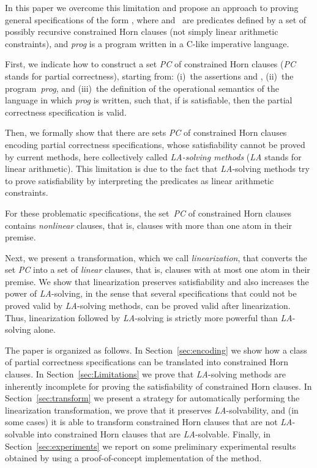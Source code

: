 \documentclass[english]{tlp}
\begin{document}
In this paper we overcome this limitation and propose an approach 
to proving general specifications of the form 
, where  
and~ are predicates defined by a set of possibly recursive constrained Horn clauses 
(not simply linear arithmetic constraints), 
and {\it prog} is a program written in a C-like imperative language.

First, we indicate how to construct 
a set \textit{PC}  of constrained Horn clauses (\textit{PC} stands for 
partial correctness), 
starting from: (i)~the assertions  and , 
(ii)~the program~\textit{prog}, and (iii)~the 
definition of the operational semantics of the language in which
 \textit{prog} is written, 
such that, if  is satisfiable, then the partial correctness 
specification  is valid.

Then, we formally show that there are sets \textit{PC} of constrained Horn clauses
encoding partial correctness specifications, whose satisfiability cannot  be
proved by current methods,
here collectively called {\it \mbox{{\textit {LA}}-solving} methods}
({\it LA} stands for linear arithmetic).
This limitation is due to the fact that 
\mbox{{\textit {LA}}-solving} methods try to prove satisfiability
by interpreting the predicates as linear arithmetic constraints.

For these problematic specifications, the set~\textit{PC} of constrained Horn clauses contains
{\it nonlinear} clauses, that is, clauses with more than one atom in their premise.

Next, we present a transformation, which we 
call {\it linearization}, that 
converts the set \textit{PC} into
a set of {\it linear} clauses, that is, clauses with at most one 
atom in their premise.
We show that linearization preserves satisfiability and also 
increases the power of {\textit {LA}}-solving, in the sense that
several specifications that could not be proved valid by {\textit {LA}}-solving methods,
can be proved valid after linearization.
Thus, linearization followed by {\textit {LA}}-solving is 
strictly more powerful than {\textit {LA}}-solving alone.

The paper is organized as follows. In Section~\ref{sec:encoding}
we show how a class of partial correctness specifications can be translated into
constrained Horn clauses.
In Section~\ref{sec:Limitations} we prove that {\textit {LA}}-solving methods
are inherently incomplete for proving the satisfiability of constrained Horn clauses.
In Section~\ref{sec:transform} we present a strategy for automatically performing 
the linearization transformation,
we prove that it preserves {\textit {LA}}-solvability, and (in some cases) it is able to
transform constrained Horn clauses that are not {\textit {LA}}-solvable into
constrained Horn clauses that are {\textit {LA}}-solvable. 
Finally, in Section~\ref{sec:experiments}
we report on some preliminary experimental results obtained by using
a proof-of-concept implementation of the method.
\end{document}
